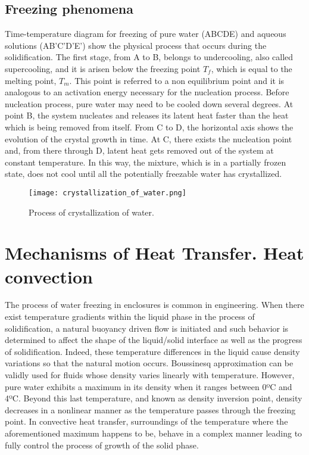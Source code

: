 \subsection{Freezing phenomena}
Time-temperature diagram for freezing of pure water (ABCDE) and aqueous solutions (AB'C'D'E') show the physical process that occurs during the solidification. The first stage, from A to B, belongs to undercooling, also called supercooling, and it is arisen below the freezing point $T_f$, which is equal to the melting point, $T_m$. This point is referred to a non equilibrium point and it is analogous to an activation energy necessary for the nucleation process. Before nucleation process, pure water may need to be cooled down several degrees. At point B, the system nucleates and releases its latent heat faster than the heat which is being removed from itself.
\newline
From C to D, the horizontal axis shows the evolution of the crystal growth in time. At C, there exists the nucleation point and, from there through D, latent heat gets removed out of the system at constant temperature. In this way, the mixture, which is in a partially frozen state, does not cool until all the potentially freezable water has crystallized.


\begin{figure}[h]
	\label{fig:boat1}
	\centering	
	\texttt{[image: crystallization\_of\_water.png]}
	\caption{Process of crystallization of water.}
\end{figure} 

\section{Mechanisms of Heat Transfer. Heat convection}
The process of water freezing in enclosures is common in engineering. When there exist temperature gradients within the liquid phase in the process of solidification, a natural buoyancy driven flow is initiated and such behavior is determined to affect the shape of the liquid/solid interface as well as the progress of solidification.
\newline
Indeed, these temperature differences in the liquid cause density variations so that the natural motion occurs. Boussinesq approximation can be validly used for fluids whose density varies linearly with temperature. However, pure water exhibits a maximum in its density when it ranges between 0ºC and 4ºC. Beyond this last temperature, and known as density inversion point, density decreases in a nonlinear manner as the temperature passes through the freezing point. In convective heat transfer, surroundings of the temperature where the aforementioned maximum happens to be, behave in a complex manner leading to fully control the process of growth of the solid phase.
\newline

